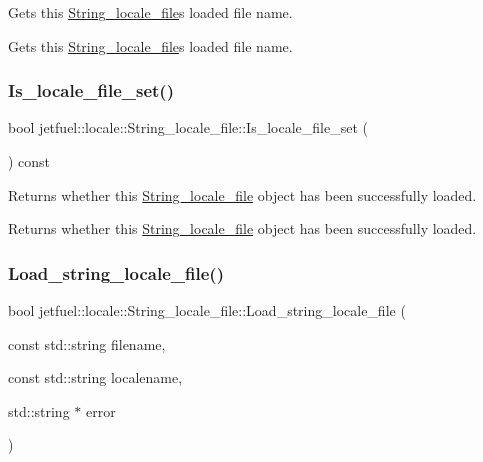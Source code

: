 Gets this \hyperlink{classjetfuel_1_1locale_1_1String__locale__file}{String\+\_\+locale\+\_\+file}\textquotesingle{}s loaded file name. 

Gets this \hyperlink{classjetfuel_1_1locale_1_1String__locale__file}{String\+\_\+locale\+\_\+file}\textquotesingle{}s loaded file name. \mbox{\label{classjetfuel_1_1locale_1_1String__locale__file_a66f25007449bac68d94e0cea2c13b313}} 
\subsubsection{\texorpdfstring{Is\+\_\+locale\+\_\+file\+\_\+set()}{Is\_locale\_file\_set()}}
{\footnotesize\ttfamily bool jetfuel\+::locale\+::\+String\+\_\+locale\+\_\+file\+::\+Is\+\_\+locale\+\_\+file\+\_\+set (\begin{DoxyParamCaption}{ }\end{DoxyParamCaption}) const\hspace{0.3cm}{\ttfamily [inline]}}



Returns whether this \hyperlink{classjetfuel_1_1locale_1_1String__locale__file}{String\+\_\+locale\+\_\+file} object has been successfully loaded. 

Returns whether this \hyperlink{classjetfuel_1_1locale_1_1String__locale__file}{String\+\_\+locale\+\_\+file} object has been successfully loaded. \mbox{\label{classjetfuel_1_1locale_1_1String__locale__file_a904609e7cde4eb624cb940cbba642ea0}} 
\subsubsection{\texorpdfstring{Load\+\_\+string\+\_\+locale\+\_\+file()}{Load\_string\_locale\_file()}\hspace{0.1cm}{\footnotesize\ttfamily [1/2]}}
{\footnotesize\ttfamily bool jetfuel\+::locale\+::\+String\+\_\+locale\+\_\+file\+::\+Load\+\_\+string\+\_\+locale\+\_\+file (\begin{DoxyParamCaption}\item[{const std\+::string}]{filename,  }\item[{const std\+::string}]{localename,  }\item[{std\+::string $\ast$}]{error }\end{DoxyParamCaption})}



